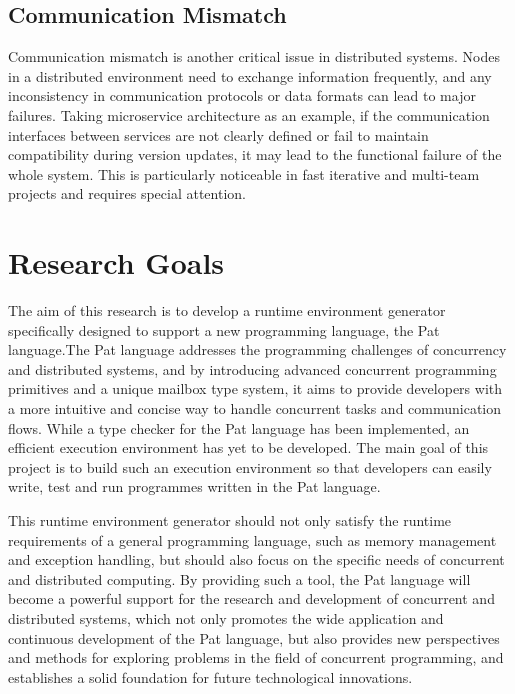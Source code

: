 \documentclass{l4proj}
\begin{document}
\subsection{Communication Mismatch}

Communication mismatch is another critical issue in distributed systems. Nodes in a distributed environment need to exchange information frequently, and any inconsistency in communication protocols or data formats can lead to major failures. Taking microservice architecture as an example, if the communication interfaces between services are not clearly defined or fail to maintain compatibility during version updates, it may lead to the functional failure of the whole system. This is particularly noticeable in fast iterative and multi-team projects and requires special attention.

\section{Research Goals}

The aim of this research is to develop a runtime environment generator specifically designed to support a new programming language, the Pat language.The Pat language addresses the programming challenges of concurrency and distributed systems, and by introducing advanced concurrent programming primitives and a unique mailbox type system, it aims to provide developers with a more intuitive and concise way to handle concurrent tasks and communication flows. While a type checker for the Pat language has been implemented, an efficient execution environment has yet to be developed. The main goal of this project is to build such an execution environment so that developers can easily write, test and run programmes written in the Pat language.

This runtime environment generator should not only satisfy the runtime requirements of a general programming language, such as memory management and exception handling, but should also focus on the specific needs of concurrent and distributed computing. By providing such a tool, the Pat language will become a powerful support for the research and development of concurrent and distributed systems, which not only promotes the wide application and continuous development of the Pat language, but also provides new perspectives and methods for exploring problems in the field of concurrent programming, and establishes a solid foundation for future technological innovations.


\end{document}
